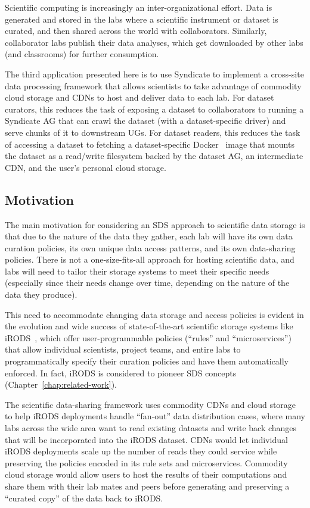 Scientific computing is increasingly an inter-organizational effort.  Data is
generated and stored in the labs where a scientific instrument or dataset is
curated, and then shared across the world with collaborators.  Similarly,
collaborator labs publish their data analyses, which get downloaded by other labs
(and classrooms) for further consumption.

The third application presented here is to use 
Syndicate to implement a cross-site data processing framework that
allows scientists to take advantage of commodity cloud storage and CDNs to host
and deliver data to each lab.  For dataset curators, this reduces the task of
exposing a dataset to collaborators to running a Syndicate AG that can crawl the
dataset (with a dataset-specific driver) and serve chunks of it to downstream
UGs.  For dataset readers, this reduces the task of accessing a dataset to
fetching a dataset-specific Docker~\cite{docker} image that mounts the dataset
as a read/write filesystem backed by the dataset AG, an intermediate CDN, and
the user's personal cloud storage.

\subsection{Motivation}

The main motivation for considering an SDS approach to scientific data storage is
that due to the nature of the data they gather, each lab will have its own data curation
policies, its own unique data access patterns, and its own data-sharing policies.
There is not a one-size-fits-all approach for hosting scientific data, and labs will need to tailor
their storage systems to meet their specific needs (especially since their needs
change over time, depending on the nature of the data they produce).

This need to accommodate changing data storage and access policies is evident in
the evolution and wide success of state-of-the-art scientific storage systems
like iRODS~\cite{irods}, which offer
user-programmable policies (``rules'' and ``microservices'') that allow
individual scientists, project teams, and entire labs to programmatically
specify their curation policies and have them automatically enforced.
In fact, iRODS is considered to pioneer SDS concepts
(Chapter~\ref{chap:related-work}).

The scientific data-sharing framework uses commodity CDNs and cloud storage to help iRODS deployments
handle ``fan-out'' data distribution cases, where many labs across the wide
area want to read existing datasets and write back changes that will be
incorporated into the iRODS dataset.  CDNs would let individual iRODS
deployments scale up the number of reads they could service while preserving the
policies encoded in its rule sets and microservices.  Commodity cloud
storage would allow users to host the results of their computations and share
them with their lab mates and peers before generating and preserving a
``curated copy'' of the data back to iRODS.

